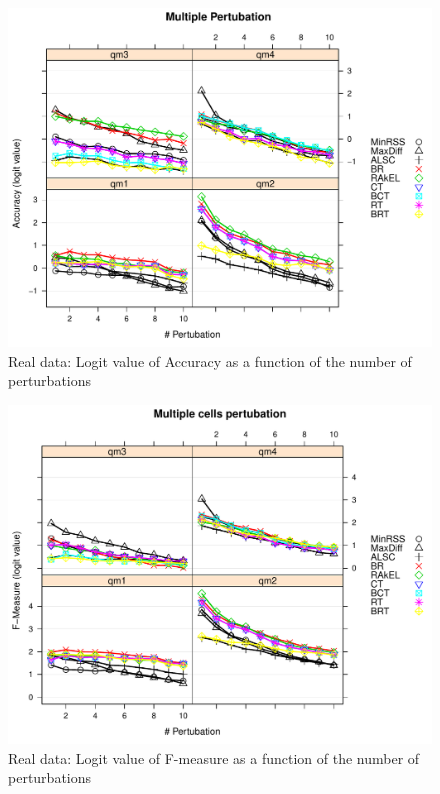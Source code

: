 \documentclass[12pt]{article}
\begin{document}
\begin{figure}
  \centering
    \includegraphics[width=100 mm ,scale=0.25]{graph/SA.pdf}
  \caption{Real data: Logit value of Accuracy as a function of the number of perturbations}\label{fig:SAforReal}
\end{figure}

\begin{figure}
  \centering
    \includegraphics[width=100 mm ,scale=0.25]{graph/FM.pdf}
    \caption{Real data: Logit value of F-measure as a function of the number of perturbations}\label{fig:FMforReal}
\end{figure}



\end{document}
